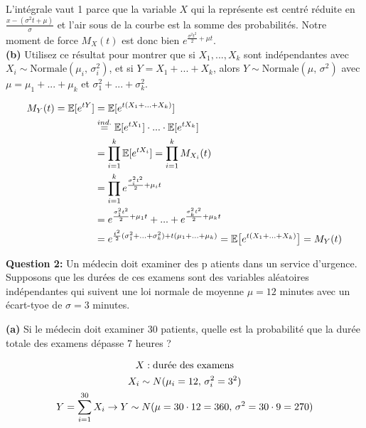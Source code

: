 \documentclass[10pt,a4paper]{article}
\begin{document}
	L'intégrale vaut 1 parce que la variable $X$ qui la représente est centré réduite en \(\frac{x - (\sigma^2 t + \mu)}{\sigma}\) et l'air sous de la courbe est la somme des probabilités. Notre moment de force $M_X(t)$ est donc bien \(e^{\frac{\sigma^2 t^2}{2} + \mu t}\). \\

	\textbf{(b)} Utilisez ce résultat pour montrer que si \(X_1,...,X_k\) sont indépendantes avec \(X_i \sim \text{Normale}(\mu_i,\, \sigma^2_i)\), et si \(Y = X_1 + ... + X_k\), alors \(Y \sim \text{Normale}(\mu,\, \sigma^2)\) avec \(\mu = \mu_1 + ... + \mu_k\) et \(\sigma^2_1 + ... + \sigma^2_k\).

	\vspace{-.2cm}
	\begin{align}
		M_Y(t) = \mathbb{E}[e^{tY}] &= \mathbb{E}[e^{t(X_1 + ... + X_k)}] \notag \\
		&\stackrel{ind.}{=} \mathbb{E}[e^{tX_1}] \cdot ... \cdot \mathbb{E}[e^{tX_k}] \notag \\
		&= \prod^k_{i = 1} \mathbb{E}[e^{tX_i}] = \prod^k_{i = 1} M_{X_i} (t) \notag \\
		&= \prod^k_{i = 1} e^{\frac{\sigma^2_i t^2}{2} + \mu_i t} \notag \\
		&= e^{\frac{\sigma^2_1 t^2}{2} + \mu_1 t} + ... + e^{\frac{\sigma^2_k t^2}{2} + \mu_k t} \notag \\
		&= e^{\frac{t^2}{2}(\sigma^2_1 + ... + \sigma^2_k) + t(\mu_1 + ... + \mu_k)} = \mathbb{E}\big[e^{t(X_1 + ... + X_k)}\big] = M_Y(t) \notag
	\end{align}

	\textbf{Question 2:} Un médecin doit examiner des p	atients dans un service d'urgence. Supposons que les durées de ces examens sont des variables aléatoires indépendantes qui suivent une loi normale de moyenne $\mu = 12$ minutes avec un écart-tyoe de $\sigma = 3$ minutes.

	\vspace{.2cm}
	\textbf{(a)} Si le médecin doit examiner 30 patients, quelle est la probabilité que la durée totale des examens dépasse 7 heures ?
	
	\vspace{-.35cm}
	\begin{gather}
		X : \text{durée des examens} \notag \\
		X_i \sim N(\mu_i = 12,\, \sigma^2_i = 3^2) \notag \\
		Y = \sum_{i = 1}^{30} X_i \rightarrow Y \sim N(\mu = 30 \cdot 12 = 360,\, \sigma^2 = 30 \cdot 9 = 270) \notag
	\end{gather}
\end{document}
